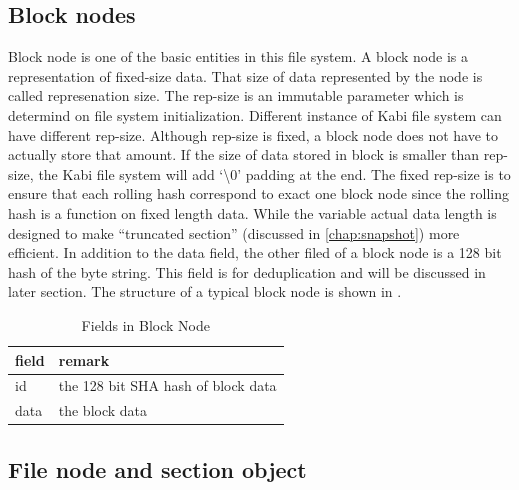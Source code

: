\subsection{Block nodes}

    Block node is one of the basic entities in this file system. A block node is a representation of fixed-size data. That size of data represented by the node is called represenation size. The rep-size is an immutable parameter which is determind on file system initialization. Different instance of Kabi file system can have different rep-size. Although rep-size is fixed, a block node does not have to actually store that amount. If the size of data stored in block is smaller than rep-size, the Kabi file system will add `\textbackslash0' padding at the end. The fixed rep-size is to ensure that each rolling hash correspond to exact one block node since the rolling hash is a function on fixed length data. While the variable actual data length is designed to make ``truncated section'' (discussed in \cref{chap:snapshot}) more efficient. In addition to the data field, the other filed of a block node is a 128 bit hash of the byte string. This field is for deduplication and will be discussed in later section. The structure of a typical block node is shown in .

\begin{table}
\caption{Fields in Block Node}
\label{tab:block_fields}
\begin{center}
\begin{tabular}{ll}
\toprule
field & remark\\
\midrule
id & the 128 bit SHA hash of block data\\
data & the block data\\
\bottomrule
\end{tabular}
\end{center}
\end{table}

\subsection{File node and section object}

